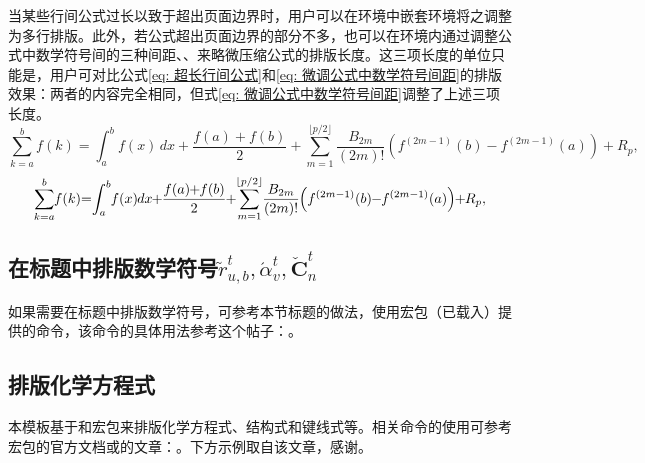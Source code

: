 \documentclass[QingNianC, vlined, timesmathnogreek]{nsfc}
\begin{document}
	当某些行间公式过长以致于超出页面边界时，用户可以在环境中嵌套环境将之调整为多行排版。此外，若公式超出页面边界的部分不多，也可以在环境内通过调整公式中数学符号间的三种间距、、来略微压缩公式的排版长度。这三项长度的单位只能是，用户可对比公式\eqref{eq: 超长行间公式}和\eqref{eq: 微调公式中数学符号间距}的排版效果：两者的内容完全相同，但式\eqref{eq: 微调公式中数学符号间距}调整了上述三项长度。
	\begin{equation} \label{eq: 超长行间公式}
		\sum_{k=a}^{b} f(k) = \int_{a}^{b} f(x) \, dx + \frac{f(a) + f(b)}{2} + \sum_{m=1}^{\lfloor p/2 \rfloor} \frac{B_{2m}}{(2m)!} \left( f^{(2m-1)}(b) - f^{(2m-1)}(a) \right) + R_p,
	\end{equation}
	\begin{equation} \label{eq: 微调公式中数学符号间距}
		\thinmuskip=-1mu \medmuskip=-1mu \thickmuskip=0mu
		\sum_{k=a}^{b} f(k) = \int_{a}^{b} f(x) \, dx + \frac{f(a) + f(b)}{2} + \sum_{m=1}^{\lfloor p/2 \rfloor} \frac{B_{2m}}{(2m)!} \left( f^{(2m-1)}(b) - f^{(2m-1)}(a) \right) + R_p,
	\end{equation}


	\subsection{在标题中排版数学符号\texorpdfstring{$\tilde{r}^t_{u,b}, \acute{\alpha}^t_v, \check{\boldsymbol{C}}^t_n$}{示例}}

	如果需要在标题中排版数学符号，可参考本节标题的做法，使用\href{https://mirrors.tuna.tsinghua.edu.cn/CTAN/macros/latex/contrib/hyperref/doc/hyperref-doc.pdf}{\ttfamily\color{DarkRed}}宏包（已载入）提供的命令，该命令的具体用法参考这个帖子：\href{https://blog.csdn.net/qq_42679415/article/details/139592054}{\ttfamily\color{DarkRed}}。

	
	\subsection{排版化学方程式}

	本模板基于\href{https://mirrors.cloud.tencent.com/CTAN/macros/latex/contrib/mhchem/mhchem.pdf}{\ttfamily\color{DarkRed}}和\href{https://mirrors.bfsu.edu.cn/CTAN/macros/generic/chemfig/chemfig-en.pdf}{\ttfamily\color{DarkRed}}宏包来排版化学方程式、结构式和键线式等。相关命令的使用可参考宏包的官方文档或\href{https://www.luogu.com.cn/user/45443}{\color{DarkRed}}的文章：\href{https://www.luogu.com.cn/article/o7mlv3w8}{\color{DarkRed}}。下方示例取自该文章，感谢。
\end{document}
